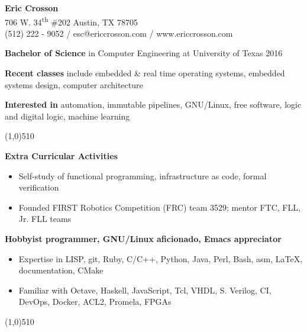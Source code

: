 \documentclass{report}
\newcommand{\cut}{\begin{center} \line(1,0){510} \end{center}}
\begin{document}
\pagestyle{empty}
\setlength\parindent{0pt}

\begin{center}
  \textbf{Eric Crosson} \\
  706 W. 34\textsuperscript{th} \#202 Austin, TX 78705 \\
  (512) 222 - 9052 / esc@ericcrosson.com / www.ericcrosson.com
\end{center}

\textbf{Bachelor of Science} in Computer Engineering at University of Texas
2016

\vspace{1mm}

\textbf{Recent classes} include embedded \& real time operating systems,
embedded systems design, computer architecture

\vspace{1mm}

\textbf{Interested in} automation, immutable pipelines, GNU/Linux, free
software, logic and digital logic, machine learning

\cut{}

\textbf{Extra Curricular Activities}
\begin{itemize}[label=$\circ$]
\item Self-study of functional programming, infrastructure as code, formal
  verification
\item Founded FIRST Robotics Competition (FRC) team 3529; mentor FTC, FLL, Jr. FLL teams
\end{itemize}

\textbf{Hobbyist programmer, GNU/Linux aficionado, Emacs appreciator}
\begin{itemize}[label=$\circ$]
\item Expertise in LISP, git, Ruby, C/C++, Python, Java, Perl, Bash, asm,
  \LaTeX{}, documentation, CMake
\item Familiar with Octave, Haskell, JavaScript, Tcl, VHDL, S.
  Verilog, CI, DevOps, Docker, ACL2, Promela, FPGAs
\end{itemize}

\cut{}
\end{document}
